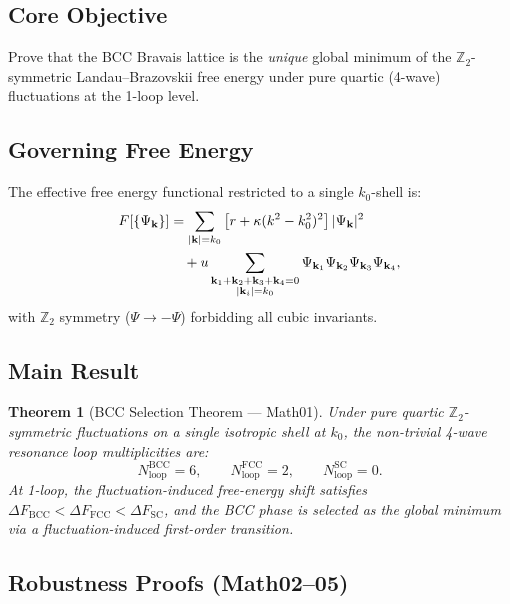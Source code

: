 \documentclass[reprint,aps,pre,onecolumn,superscriptaddress,amsmath,amssymb]{revtex4-2}
\newcommand{\Nloop}{N_{\mathrm{loop}}}
\newtheorem{theorem}{Theorem}[section]
\begin{document}
\subsection{Core Objective}

Prove that the BCC Bravais lattice is the \emph{unique} global minimum of the
$\mathbb{Z}_{2}$-symmetric Landau--Brazovskii free energy under pure quartic
(4-wave) fluctuations at the 1-loop level.

\subsection{Governing Free Energy}

The effective free energy functional restricted to a single $k_{0}$-shell is:
\begin{align}
  F[\{\Psi_{\mathbf{k}}\}]
  &=
  \sum_{|\mathbf{k}|=k_{0}} \left[ r + \kappa(k^{2}-k_{0}^{2})^{2} \right] |\Psi_{\mathbf{k}}|^{2}
  \notag\\
  &\quad
  + u \sum_{\substack{\mathbf{k}_{1}+\mathbf{k}_{2}+\mathbf{k}_{3}+\mathbf{k}_{4}=0\\
    |\mathbf{k}_{i}|=k_{0}}}
  \Psi_{\mathbf{k}_{1}}\Psi_{\mathbf{k}_{2}}\Psi_{\mathbf{k}_{3}}\Psi_{\mathbf{k}_{4}},
  \label{eq:LB-free-energy}
\end{align}
with $\mathbb{Z}_{2}$ symmetry ($\Psi\to -\Psi$) forbidding all cubic invariants.

\subsection{Main Result}

\begin{theorem}[BCC Selection Theorem --- Math01]
  \label{thm:BCC}
  Under pure quartic $\mathbb{Z}_{2}$-symmetric fluctuations on a single isotropic
  shell at $k_{0}$, the non-trivial 4-wave resonance loop multiplicities are:
  \begin{equation}
    \Nloop^{\mathrm{BCC}} = 6,
    \qquad
    \Nloop^{\mathrm{FCC}} = 2,
    \qquad
    \Nloop^{\mathrm{SC}} = 0.
    \label{eq:Nloop}
  \end{equation}
  At 1-loop, the fluctuation-induced free-energy shift satisfies
  $\Delta F_{\mathrm{BCC}} < \Delta F_{\mathrm{FCC}} < \Delta F_{\mathrm{SC}}$,
  and the BCC phase is selected as the global minimum via a
  fluctuation-induced first-order transition.
\end{theorem}

\subsection{Robustness Proofs (Math02--05)}
\end{document}
